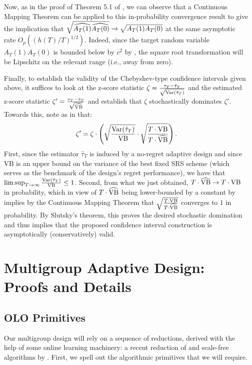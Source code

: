     Now, as in the proof of Theorem 5.1 of \citet{dai2023clip}, we can observe that a Continuous Mapping Theorem can be applied to this in-probability convergence result to give the implication that $\sqrt{\widehat{A_T(1)} \widehat{A_T(0)}} \to \sqrt{A_T(1) A_T(0)}$ at the same asymptotic rate $O_p((h(T)/T)^{1/2})$. Indeed, since the target random variable $A_T(1) A_T(0)$ is bounded below by $c^2$ by , the square root transformation will be Lipschitz on the relevant range (i.e., away from zero).

    Finally, to establish the validity of the Chebyshev-type confidence intervals given above, it suffices to look at the z-score statistic $\zeta = \frac{\tau_T - \hat{\tau}_T}{\sqrt{\mathop{\mathrm{Var}}(\hat{\tau}_T)}}$ and the estimated z-score statistic $\zeta' = \frac{\tau_T - \hat{\tau}_T}{\sqrt{\widehat{\mathrm{VB}}}}$ and establish that $\zeta$ stochastically dominates $\zeta'$. Towards this, note as in \citet{dai2023clip} that:
    \[
    \zeta' = \zeta \cdot \left( \sqrt{\frac{\mathop{\mathrm{Var}}(\hat{\tau}_T)}{\mathrm{VB}}} \cdot \sqrt{\frac{T \cdot \mathrm{VB}}{T \cdot \widehat{\mathrm{VB}}}} \right).
    \]
    First, since the estimator $\hat{\tau}_T$ is induced by a no-regret adaptive design and since $\mathrm{VB}$ is an upper bound on the variance of the best fixed SRS scheme (which serves as the benchmark of the design's regret performance), we have that $\limsup_{T\to \infty} \frac{\mathop{\mathrm{Var}}(\hat{\tau}_T)}{\mathrm{VB}} \leq 1$. Second, from what we just obtained, $T \cdot \widehat{\mathrm{VB}} \to T \cdot \mathrm{VB}$ in probability, which in view of $T \cdot \widehat{\mathrm{VB}}$ being lower-bounded by a constant by  implies by the Continuous Mapping Theorem that $\sqrt{\frac{T \cdot \mathrm{VB}}{T \cdot \widehat{\mathrm{VB}}}}$ converges to $1$ in probability. By Slutsky's theorem, this proves the desired stochastic domination and thus implies that the proposed confidence interval construction is asymptotically (conservatively) valid.


\section{Multigroup Adaptive Design: Proofs and Details} \label{app:multigroup}


\subsection{OLO Primitives} \label{app:multigroup-se}

Our multigroup design will rely on a sequence of reductions, derived with the help of some online learning machinery: a recent reduction of \citet{SleepingExpertsOrabona} and scale-free algorithms by \citet{orabona2018scale}.
First, we spell out the algorithmic primitives that we will require.

